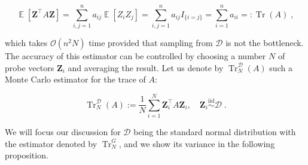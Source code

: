 \documentclass{article}
\newcommand{\vect}[1]{\boldsymbol{\mathbf{#1}}}
\DeclareMathOperator{\trace}{Tr}
\DeclareMathOperator{\E}{\mathbb{E}}
\begin{document}
\begin{equation*}
    \E[\vect Z^\top A \vect Z] = \sum_{i,j=1}^n a_{ij} \E[Z_i Z_j] = \sum_{i,j=1}^n a_{ij} I_{\{i=j\}} = \sum_{i=1}^n a_{ii} =: \trace(A) \; ,
\end{equation*}

which takes $\mathcal O(n^2N)$ time provided that sampling from $\mathcal D$ is not the bottleneck. The accuracy of this estimator can be controlled by choosing a number $N$ of probe vectors $\vect Z_i$ and averaging the result. Let us denote by $\trace_N^{\mathcal D}(A)$ such a Monte Carlo estimator for the trace of $A$:

\begin{equation*}
    \trace_N^{\mathcal D}(A) := \frac{1}{N} \sum_{i=1}^N \vect Z_i^\top A \vect Z_i, \quad \vect Z_i \stackrel{\text{iid}}{\sim} \mathcal D \;.
\end{equation*}

We will focus our discussion for $\mathcal D$ being the standard normal distribution with the estimator denoted by $\trace_N^G$, and we show its variance in the following proposition.
\end{document}
